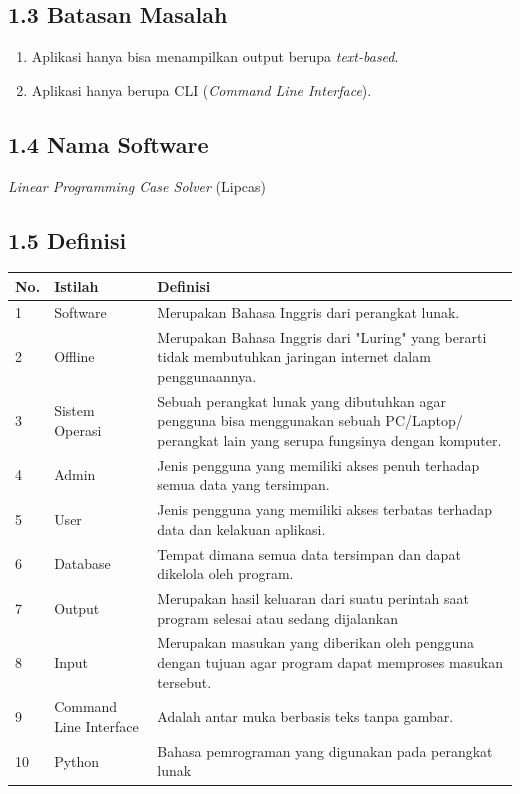 \documentclass[a4paper]{article}
\begin{document}
    \subsection*{1.3 Batasan Masalah}
    \begin{enumerate}
        \item Aplikasi hanya bisa menampilkan output berupa \textit{text-based}.
        \item Aplikasi hanya berupa CLI (\textit{Command Line Interface}).
    \end{enumerate}
    \subsection*{1.4 Nama Software}
    \noindent \textit{Linear Programming Case Solver} (Lipcas)
    \subsection*{1.5 Definisi }
    \begin{tabular}{ | m{1em}| m{} | m{} | }
        \hline
        \textbf{No.} & \textbf{Istilah} & \textbf{Definisi}\\
        \hline
        1 & Software & Merupakan Bahasa Inggris dari perangkat lunak.\\
        \hline
        2 & Offline & Merupakan Bahasa Inggris dari "Luring" yang berarti tidak
        membutuhkan jaringan internet dalam penggunaannya.\\
        \hline
        3 & Sistem Operasi & Sebuah perangkat lunak yang dibutuhkan
        agar pengguna bisa menggunakan sebuah PC/Laptop/ perangkat lain
        yang serupa fungsinya dengan komputer.\\
        \hline
        4 & Admin & Jenis pengguna yang memiliki akses penuh terhadap
        semua data yang tersimpan.\\
        \hline
        5 & User & Jenis pengguna yang memiliki akses terbatas terhadap
        data dan kelakuan aplikasi.\\
        \hline
        6 & Database & Tempat dimana semua data tersimpan dan dapat dikelola
        oleh program.\\
        \hline
        7 & Output & Merupakan hasil keluaran dari suatu perintah saat program
        selesai atau sedang dijalankan\\
        \hline
        8 & Input & Merupakan masukan yang diberikan oleh pengguna dengan tujuan 
        agar program dapat memproses masukan tersebut.\\
        \hline
        9 & Command Line Interface & Adalah antar muka berbasis teks tanpa gambar.\\
        \hline
        10 & Python & Bahasa pemrograman yang digunakan pada perangkat lunak \\
        \hline
    \end{tabular}
\end{document}
